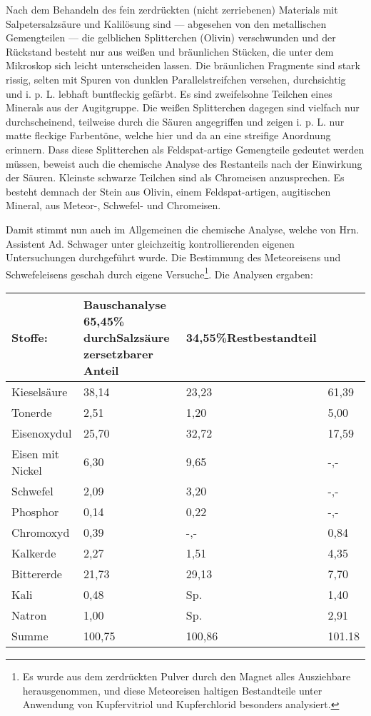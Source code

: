 \documentclass[a4paper, 11pt, oneside]{article}
\begin{document}
Nach dem Behandeln des fein zerdrückten (nicht zerriebenen) Materials mit Salpetersalzsäure und Kalilösung sind — abgesehen von den metallischen Gemengteilen — die gelblichen Splitterchen (Olivin) verschwunden und der Rückstand besteht nur aus weißen und bräunlichen Stücken, die unter dem Mikroskop sich leicht unterscheiden lassen. Die bräunlichen Fragmente sind stark rissig, selten mit Spuren von dunklen Parallelstreifchen versehen, durchsichtig und i. p. L. lebhaft buntfleckig gefärbt. Es sind zweifelsohne Teilchen eines Minerals aus der Augitgruppe. Die weißen Splitterchen dagegen sind vielfach nur durchscheinend, teilweise durch die Säuren angegriffen und zeigen i. p. L. nur matte fleckige Farbentöne, welche hier und da an eine streifige Anordnung erinnern. Dass diese Splitterchen als Feldspat-artige Gemengteile gedeutet werden müssen, beweist auch die chemische Analyse des Restanteils nach der Einwirkung der Säuren. Kleinste schwarze Teilchen sind als Chromeisen anzusprechen. Es besteht demnach der Stein aus Olivin, einem Feldspat-artigen, augitischen Mineral, aus Meteor-, Schwefel- und Chromeisen.

Damit stimmt nun auch im Allgemeinen die chemische Analyse, welche von Hrn. Assistent Ad. Schwager unter gleichzeitig kontrollierenden eigenen Untersuchungen durchgeführt wurde. Die Bestimmung des Meteoreisens und Schwefeleisens geschah durch eigene Versuche\footnote{Es wurde aus dem zerdrückten Pulver durch den Magnet alles Ausziehbare herausgenommen, und diese Meteoreisen haltigen Bestandteile unter Anwendung von Kupfervitriol und Kupferchlorid besonders analysiert.}. Die Analysen ergaben:
\begin{center}
\begin{tabular}{ |p{30mm}|p{35mm}|p{25mm}|p{15mm}| }
    \hline
    Stoffe: & Bauschanalyse 65,45\% durch\newline Salzsäure zersetzbarer Anteil & 34,55\%\newline Restbestandteil & \\
    \hline\hline
    Kieselsäure & 38,14 & 23,23 & 61,39\\\hline
    Tonerde & 2,51 & 1,20 & 5,00\\\hline
    Eisenoxydul & 25,70 & 32,72 & 17,59\\\hline
    Eisen mit Nickel & 6,30 & 9,65 & -,-\\\hline
    Schwefel & 2,09 & 3,20 & -,-\\\hline
    Phosphor & 0,14 & 0,22 & -,-\\\hline
    Chromoxyd & 0,39 & -,- & 0,84\\\hline
    Kalkerde & 2,27 & 1,51 & 4,35\\\hline
    Bittererde & 21,73 & 29,13 & 7,70\\\hline
    Kali & 0,48 & Sp. & 1,40\\\hline
    Natron & 1,00 & Sp. & 2,91\\\hline
    Summe & 100,75 & 100,86 & 101.18\\
    \hline
\end{tabular}
\end{center}
\end{document}
